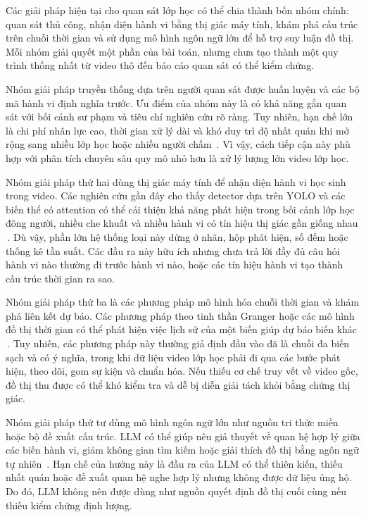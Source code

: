 Các giải pháp hiện tại cho quan sát lớp học có thể chia thành bốn nhóm chính: quan sát thủ công, nhận diện hành vi bằng thị giác máy tính, khám phá cấu trúc trên chuỗi thời gian và sử dụng mô hình ngôn ngữ lớn để hỗ trợ suy luận đồ thị. Mỗi nhóm giải quyết một phần của bài toán, nhưng chưa tạo thành một quy trình thống nhất từ video thô đến báo cáo quan sát có thể kiểm chứng.

Nhóm giải pháp truyền thống dựa trên người quan sát được huấn luyện và các bộ mã hành vi định nghĩa trước. Ưu điểm của nhóm này là có khả năng gắn quan sát với bối cảnh sư phạm và tiêu chí nghiên cứu rõ ràng. Tuy nhiên, hạn chế lớn là chi phí nhân lực cao, thời gian xử lý dài và khó duy trì độ nhất quán khi mở rộng sang nhiều lớp học hoặc nhiều người chấm \,\cite{volpe2025classroom}. Vì vậy, cách tiếp cận này phù hợp với phân tích chuyên sâu quy mô nhỏ hơn là xử lý lượng lớn video lớp học.

Nhóm giải pháp thứ hai dùng thị giác máy tính để nhận diện hành vi học sinh trong video. Các nghiên cứu gần đây cho thấy detector dựa trên YOLO và các biến thể có attention có thể cải thiện khả năng phát hiện trong bối cảnh lớp học đông người, nhiều che khuất và nhiều hành vi có tín hiệu thị giác gần giống nhau \,\cite{wang2023smartclassroom,yang2023yolov7bra,chen2023improvedyolov8,zhang2025yolov8attention}. Dù vậy, phần lớn hệ thống loại này dừng ở nhãn, hộp phát hiện, số đếm hoặc thống kê tần suất. Các đầu ra này hữu ích nhưng chưa trả lời đầy đủ câu hỏi hành vi nào thường đi trước hành vi nào, hoặc các tín hiệu hành vi tạo thành cấu trúc thời gian ra sao.

Nhóm giải pháp thứ ba là các phương pháp mô hình hóa chuỗi thời gian và khám phá liên kết dự báo. Các phương pháp theo tinh thần Granger hoặc các mô hình đồ thị thời gian có thể phát hiện việc lịch sử của một biến giúp dự báo biến khác \,\cite{granger1969causality,runge2023causalreview}. Tuy nhiên, các phương pháp này thường giả định đầu vào đã là chuỗi đa biến sạch và có ý nghĩa, trong khi dữ liệu video lớp học phải đi qua các bước phát hiện, theo dõi, gom sự kiện và chuẩn hóa. Nếu thiếu cơ chế truy vết về video gốc, đồ thị thu được có thể khó kiểm tra và dễ bị diễn giải tách khỏi bằng chứng thị giác.

Nhóm giải pháp thứ tư dùng mô hình ngôn ngữ lớn như nguồn tri thức miền hoặc bộ đề xuất cấu trúc. LLM có thể giúp nêu giả thuyết về quan hệ hợp lý giữa các biến hành vi, giảm không gian tìm kiếm hoặc giải thích đồ thị bằng ngôn ngữ tự nhiên \,\cite{darvariu2024llmpriors,roy2025causalllm}. Hạn chế của hướng này là đầu ra của LLM có thể thiên kiến, thiếu nhất quán hoặc đề xuất quan hệ nghe hợp lý nhưng không được dữ liệu ủng hộ. Do đó, LLM không nên được dùng như nguồn quyết định đồ thị cuối cùng nếu thiếu kiểm chứng định lượng.

